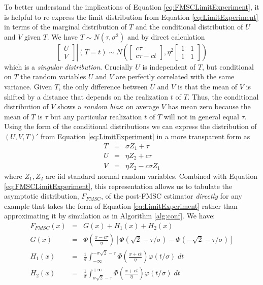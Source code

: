 To better understand the implications of Equation \ref{eq:FMSCLimitExperiment}, it is helpful to re-express the limit distribution from Equation \ref{eq:LimitExperiment} in terms of the marginal distribution of $T$ and the conditional distribution of $U$ and $V$ given $T$. 
We have $T \sim N(\tau, \sigma^2)$ and by direct calculation
\begin{equation}
  \left.\left[
  \begin{array}{c}
   U \\ V 
  \end{array}
\right]\right| (T = t) \sim N\left(
\left[
\begin{array}{c}
  c \tau \\ c\tau - ct
\end{array}
\right], \eta^2
\left[
\begin{array}{cc}
  1 & 1 \\ 1 & 1
\end{array}
\right]
\right)
\label{eq:LimitExperimentConditional}
\end{equation}
which is a \emph{singular distribution}.
Crucially $U$ is independent of $T$, but conditional on $T$ the random variables $U$ and $V$ are perfectly correlated with the same variance.
Given $T$, the only difference between $U$ and $V$ is that the mean of $V$ is shifted by a distance that depends on the realization $t$ of $T$.
Thus, the conditional distribution of $V$ shows a \emph{random bias}: on average $V$ has mean zero because the mean of $T$ is $\tau$ but any particular realization $t$ of $T$ will not in general equal $\tau$.
Using the form of the conditional distributions we can express the distribution of $(U,V,T)'$ from Equation \ref{eq:LimitExperiment} in a more transparent form as
\begin{eqnarray*}
  T &=& \sigma Z_1 + \tau\\
  U &=& \eta Z_2 + c\tau\\
  V &=& \eta Z_2 - c\sigma Z_1
\end{eqnarray*}
where $Z_1, Z_2$ are iid standard normal random variables.
Combined with Equation \ref{eq:FMSCLimitExperiment}, this representation allows us to tabulate the asymptotic distribution, $F_{FMSC}$, of the post-FMSC estimator \emph{directly} for any example that takes the form of Equation \ref{eq:LimitExperiment} rather than approximating it by simulation as in Algorithm \ref{alg:conf}.
We have:
\begin{eqnarray}
  F_{FMSC}(x) &=& G(x) + H_1(x) + H_2(x) \\
  \label{eq:FFMSC}
  G(x) &=& \Phi\left( \frac{x - c\tau}{\eta} \right)\left[ \Phi( \sqrt{2} - \tau/\sigma) -  \Phi( -\sqrt{2} - \tau/\sigma )\right]\\
  \label{eq:GFMSC}
  H_1(x) &=& \frac{1}{\sigma}\int_{-\infty}^{-\sigma\sqrt{2} - \tau} \Phi\left( \frac{x + ct}{\eta}\right)\varphi(t/\sigma)\; dt\\
  \label{eq:H1FMSC}
  H_2(x) &=& \frac{1}{\sigma}\int^{+\infty}_{\sigma\sqrt{2} - \tau} \Phi\left( \frac{x + ct}{\eta}\right)\varphi(t/\sigma)\; dt
  \label{eq:H2FMSC}
\end{eqnarray}
